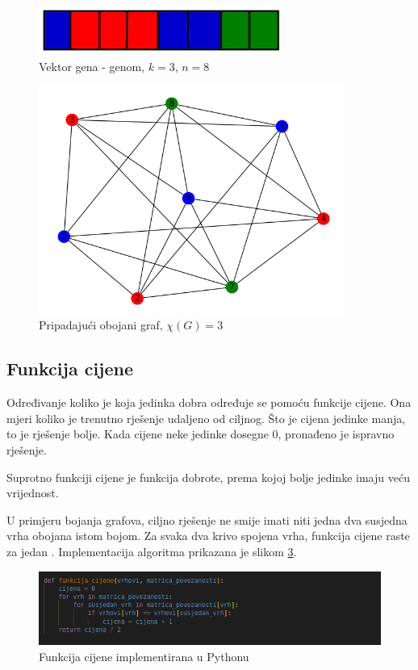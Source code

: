\documentclass[times, utf8, zavrsni, numeric]{fer}
\begin{document}
\begin{figure}[htb]
\centering
\includegraphics[width=8cm]{images/genom_encoding.png}
\caption{Vektor gena - genom, $k=3$, $n=8$}
\label{fig:kodirani genom}
\end{figure}

\begin{figure}[htb]
\centering
\includegraphics[width=10cm]{images/genom_encoding_graph.png}
\caption{Pripadajući obojani graf, $\chi(G)=3$}
\label{fig:kodiranje genoma graf}
\end{figure}

\subsection{Funkcija cijene}
\label{sec:funkcija cijene}
Određivanje koliko je koja jedinka dobra određuje se pomoću funkcije cijene. Ona mjeri koliko je trenutno rješenje udaljeno od ciljnog. Što je cijena jedinke manja, to je rješenje bolje. Kada cijene neke jedinke dosegne 0, pronađeno je ispravno rješenje.

Suprotno funkciji cijene je funkcija dobrote, prema kojoj bolje jedinke imaju veću vrijednost.

U primjeru bojanja grafova, ciljno rješenje ne smije imati niti jedna dva susjedna vrha obojana istom bojom. Za svaka dva krivo spojena vrha, funkcija cijene raste za jedan \cite{geeksforgeeks}. Implementacija algoritma prikazana je slikom \ref{fig:funkcija cijene}.

\begin{figure}[htb]
\centering
\includegraphics[width=12cm]{images/funkcija_cijene.png}
\caption{Funkcija cijene implementirana u Pythonu}
\label{fig:funkcija cijene}
\end{figure}
\end{document}
